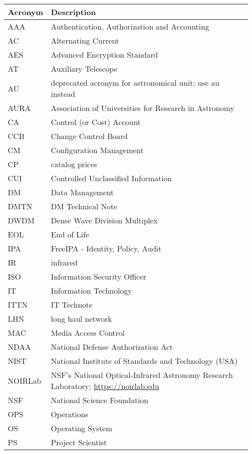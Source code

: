 \addtocounter{table}{-1}
\begin{longtable}{p{}p{}}\hline
\textbf{Acronym} & \textbf{Description}  \\\hline

AAA & Authentication, Authorization and Accounting \\\hline
AC & Alternating Current \\\hline
AES & Advanced Encryption Standard \\\hline
AT & Auxiliary Telescope \\\hline
AU & deprecated acronym for astronomical unit; use au instead \\\hline
AURA & Association of Universities for Research in Astronomy \\\hline
CA & Control (or Cost) Account \\\hline
CCB & Change Control Board \\\hline
CM & Configuration Management \\\hline
CP & catalog prices \\\hline
CUI & Controlled Unclassified Information \\\hline
DM & Data Management \\\hline
DMTN & DM Technical Note \\\hline
DWDM & Dense Wave Division Multiplex \\\hline
EOL & End of Life \\\hline
IPA & FreeIPA - Identity, Policy, Audit \\\hline
IR & infrared \\\hline
ISO & Information Security Officer \\\hline
IT & Information Technology \\\hline
ITTN & IT Technote \\\hline
LHN & long haul network \\\hline
MAC & Media Access Control \\\hline
NDAA & National Defense Authorization Act \\\hline
NIST & National Institute of Standards and Technology (USA) \\\hline
NOIRLab & NSF's National Optical-Infrared Astronomy Research Laboratory; \url{https://noirlab.edu} \\\hline
NSF & National Science Foundation \\\hline
OPS & Operations \\\hline
OS & Operating System \\\hline
PS & Project Scientist \\\hline

\end{longtable}

